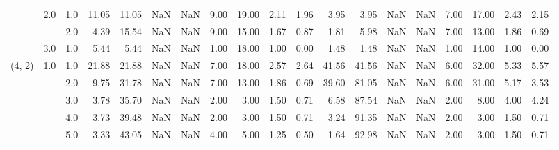\begin{tabular}{lllrrrrrrrrrrrrrrrr}
       & 2.0 & 1.0  &     11.05 &      11.05 &               NaN &                NaN &  9.00 &  19.00 &             2.11 &                         1.96 &      3.95 &       3.95 &               NaN &                NaN & 7.00 &  17.00 &             2.43 &                         2.15 \\
       &     & 2.0  &      4.39 &      15.54 &               NaN &                NaN &  9.00 &  15.00 &             1.67 &                         0.87 &      1.81 &       5.98 &               NaN &                NaN & 7.00 &  13.00 &             1.86 &                         0.69 \\
       & 3.0 & 1.0  &      5.44 &       5.44 &               NaN &                NaN &  1.00 &  18.00 &             1.00 &                         0.00 &      1.48 &       1.48 &               NaN &                NaN & 1.00 &  14.00 &             1.00 &                         0.00 \\
(4, 2) & 1.0 & 1.0  &     21.88 &      21.88 &               NaN &                NaN &  7.00 &  18.00 &             2.57 &                         2.64 &     41.56 &      41.56 &               NaN &                NaN & 6.00 &  32.00 &             5.33 &                         5.57 \\
       &     & 2.0  &      9.75 &      31.78 &               NaN &                NaN &  7.00 &  13.00 &             1.86 &                         0.69 &     39.60 &      81.05 &               NaN &                NaN & 6.00 &  31.00 &             5.17 &                         3.53 \\
       &     & 3.0  &      3.78 &      35.70 &               NaN &                NaN &  2.00 &   3.00 &             1.50 &                         0.71 &      6.58 &      87.54 &               NaN &                NaN & 2.00 &   8.00 &             4.00 &                         4.24 \\
       &     & 4.0  &      3.73 &      39.48 &               NaN &                NaN &  2.00 &   3.00 &             1.50 &                         0.71 &      3.24 &      91.35 &               NaN &                NaN & 2.00 &   3.00 &             1.50 &                         0.71 \\
       &     & 5.0  &      3.33 &      43.05 &               NaN &                NaN &  4.00 &   5.00 &             1.25 &                         0.50 &      1.64 &      92.98 &               NaN &                NaN & 2.00 &   3.00 &             1.50 &                         0.71 \\

\end{tabular}

